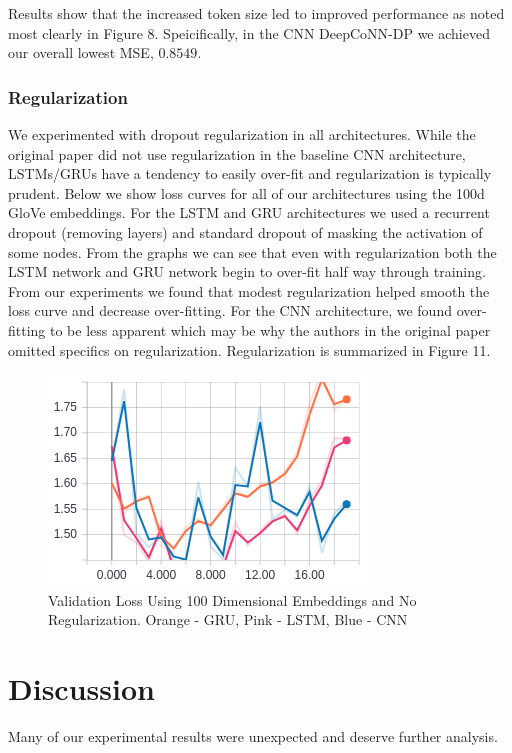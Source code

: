 \documentclass[10pt, twocolumn, letterpaper]{article}
\begin{document}
Results show that the increased token size led to improved performance as noted most clearly in Figure 8. Speicifically, in the CNN DeepCoNN-DP we achieved our overall lowest MSE, $0.8549$.\\

\subsubsection{Regularization}

We experimented with dropout regularization in all architectures. While the original paper did not use regularization in the baseline CNN architecture, LSTMs/GRUs have a tendency to easily over-fit and regularization is typically prudent. Below we show loss curves for all of our architectures using the 100d GloVe embeddings. For the LSTM and GRU architectures we used a recurrent dropout (removing layers) and standard dropout of masking the activation of some nodes. From the graphs we can see that even with regularization both the LSTM network and GRU network begin to over-fit half way through training. From our experiments we found that modest regularization helped smooth the loss curve and decrease over-fitting. For the CNN architecture, we found over-fitting to be less apparent which may be why the authors in the original paper omitted specifics on regularization. Regularization is summarized in Figure 11.

\begin{figure}
\includegraphics[scale=0.6]{100D_Val_loss.png}
    \caption{Validation Loss Using 100 Dimensional Embeddings and No Regularization. Orange - GRU, Pink - LSTM, Blue - CNN}
\end{figure}

\section{Discussion}

Many of our experimental results were unexpected and deserve further analysis.
\end{document}
